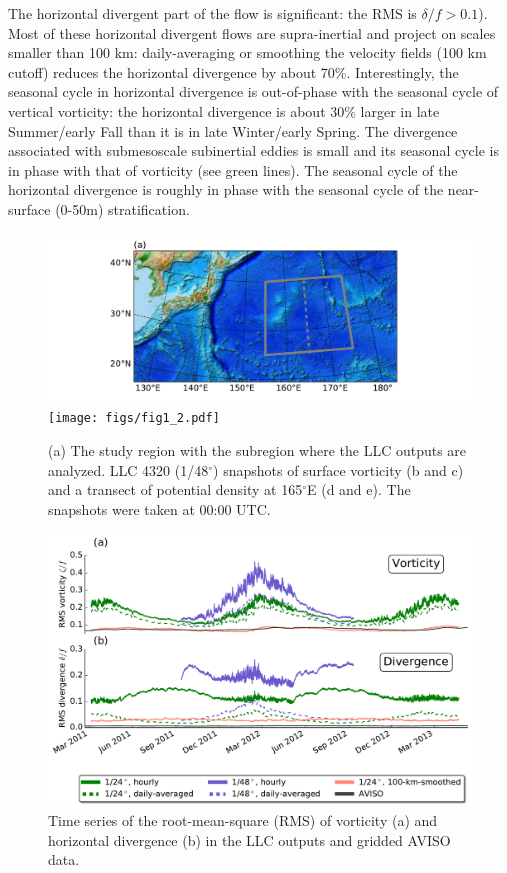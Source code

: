 \documentclass[grl]{agutex2015}
\begin{document}
\begin{article}
The horizontal divergent part of the flow is significant: the RMS is $\delta/f > 0.1$).
Most of these horizontal divergent flows are supra-inertial and project
on scales smaller than 100 km: daily-averaging or smoothing the velocity fields
 (100 km cutoff) reduces the horizontal divergence by about 70$\%$.
Interestingly, the seasonal cycle in horizontal divergence is out-of-phase with the
seasonal cycle of vertical vorticity: the horizontal divergence is about 30$\%$ larger in late
Summer/early Fall than it is in late Winter/early Spring. The divergence associated
with submesoscale subinertial eddies is small and its seasonal cycle is in phase
with that of vorticity (see green lines).  The seasonal cycle of the horizontal
divergence is roughly in phase with the seasonal cycle of the near-surface (0-50m)
stratification.
\begin{figure}[ht]
\begin{center}
\hspace{-1.25cm}\includegraphics[width=.7\textwidth]{figs/fig1_1.pdf}\\
\vspace{-.125cm}
\texttt{[image: figs/fig1\_2.pdf]}
 \caption{(a) The study region with the subregion where the LLC outputs are
          analyzed. LLC 4320 (1/48$^\circ$) snapshots of surface vorticity (b and c) and a transect
          of potential density at 165$^\circ$E (d and e). The snapshots were
          taken at 00:00 UTC.}
\vspace{-1.5cm}
 \label{fig1}
 \end{center}
 \end{figure}

 \begin{figure}[ht]
   \begin{center}
     \includegraphics[width=.9\textwidth]{figs/fig2.pdf}
  \caption{Time series of the root-mean-square (RMS) of vorticity (a) and
  horizontal divergence (b) in the LLC outputs and gridded AVISO data.}
  \label{fig2}
  \end{center}
\end{figure}


\end{article}
\end{document}
